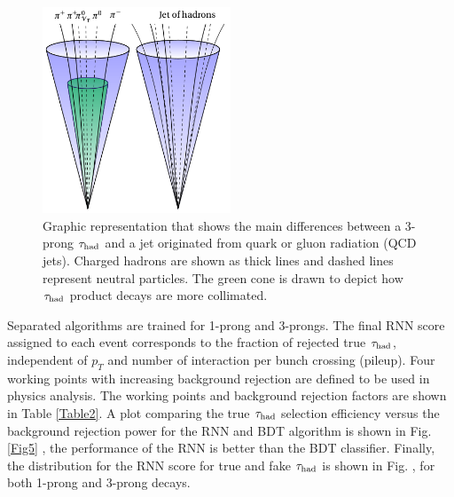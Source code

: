 \begin{figure}[h]
	\centering
	\includegraphics[width=0.5\textwidth]{figures/Fig4}
	\caption{Graphic representation that shows the main differences between a 3-prong $\tau_\text{had}$ and a jet originated from quark or gluon radiation (QCD jets). Charged hadrons are shown as thick lines and dashed lines represent neutral particles. The green cone is drawn to depict how $\tau_\text{had}$ product decays are more collimated.}
	\label{Fig4}
\end{figure}
Separated algorithms are trained for 1-prong and 3-prongs. The final RNN score assigned to each event corresponds to the fraction of rejected true $\tau_\text{had}$, independent of $p_T$ and number of interaction per bunch crossing (pileup). Four working points with increasing background rejection are defined to be used in physics analysis. The working points and background rejection factors are shown in Table \ref{Table2}. A plot comparing the true $\tau_\text{had}$ selection efficiency versus the background rejection power for the RNN and BDT algorithm is shown in Fig.\ref{Fig5} , the performance of the RNN is better than the BDT classifier. Finally, the distribution for the RNN score for true and fake $\tau_\text{had}$ is shown in Fig. , for both 1-prong and 3-prong decays.
